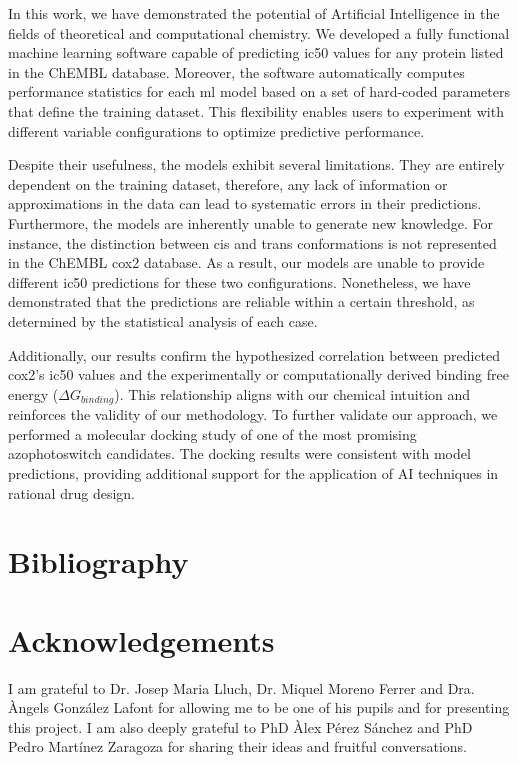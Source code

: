 \documentclass[11pt]{article}
\begin{document}
In this work, we have demonstrated the potential of Artificial Intelligence in the fields of theoretical and computational chemistry. We developed a fully functional machine learning software capable of predicting \gls{ic50} values for any protein listed in the ChEMBL database. Moreover, the software automatically computes performance statistics for each \gls{ml} model based on a set of hard-coded parameters that define the training dataset. This flexibility enables users to experiment with different variable configurations to optimize predictive performance.

Despite their usefulness, the models exhibit several limitations. They are entirely dependent on the training dataset, therefore, any lack of information or approximations in the data can lead to systematic errors in their predictions. Furthermore, the models are inherently unable to generate new knowledge. For instance, the distinction between cis and trans conformations is not represented in the ChEMBL \gls{cox2} database. As a result, our models are unable to provide different \gls{ic50} predictions for these two configurations. Nonetheless, we have demonstrated that the predictions are reliable within a certain threshold, as determined by the statistical analysis of each case.

Additionally, our results confirm the hypothesized correlation between predicted \gls{cox2}'s \gls{ic50} values and the experimentally or computationally derived binding free energy ($\Delta G_{binding}$). This relationship aligns with our chemical intuition and reinforces the validity of our methodology. To further validate our approach, we performed a molecular docking study of one of the most promising azophotoswitch candidates. The docking results were consistent with model predictions, providing additional support for the application of AI techniques in rational drug design.

\newpage
\section{Bibliography}
\printbibliography[title = { \vspace{-1cm}}]

\newpage
\section{Acknowledgements}
I am grateful to Dr. Josep Maria Lluch, Dr. Miquel Moreno Ferrer and Dra. Àngels González Lafont for allowing me to be one of his pupils and for presenting this project. I am also deeply grateful to PhD Àlex Pérez Sánchez and PhD Pedro Martínez Zaragoza for sharing their ideas and fruitful conversations.
\end{document}
